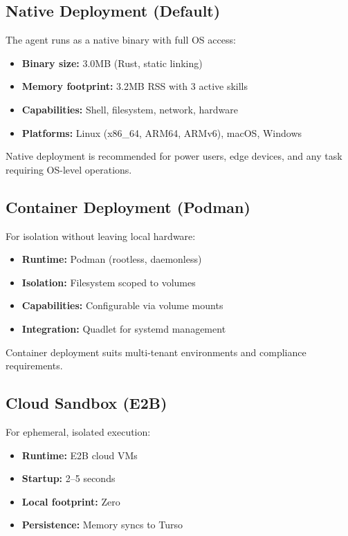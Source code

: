 \documentclass{article}
\begin{document}
\subsection{Native Deployment (Default)}

The agent runs as a native binary with full OS access:

\begin{itemize}[leftmargin=*]
    \item \textbf{Binary size:} 3.0MB (Rust, static linking)
    \item \textbf{Memory footprint:} 3.2MB RSS with 3 active skills
    \item \textbf{Capabilities:} Shell, filesystem, network, hardware
    \item \textbf{Platforms:} Linux (x86\_64, ARM64, ARMv6), macOS, Windows
\end{itemize}

Native deployment is recommended for power users, edge devices, and any task requiring OS-level operations.

\subsection{Container Deployment (Podman)}

For isolation without leaving local hardware:

\begin{itemize}[leftmargin=*]
    \item \textbf{Runtime:} Podman (rootless, daemonless)
    \item \textbf{Isolation:} Filesystem scoped to volumes
    \item \textbf{Capabilities:} Configurable via volume mounts
    \item \textbf{Integration:} Quadlet for systemd management
\end{itemize}

Container deployment suits multi-tenant environments and compliance requirements.

\subsection{Cloud Sandbox (E2B)}

For ephemeral, isolated execution:

\begin{itemize}[leftmargin=*]
    \item \textbf{Runtime:} E2B cloud VMs
    \item \textbf{Startup:} 2--5 seconds
    \item \textbf{Local footprint:} Zero
    \item \textbf{Persistence:} Memory syncs to Turso
\end{itemize}
\end{document}
